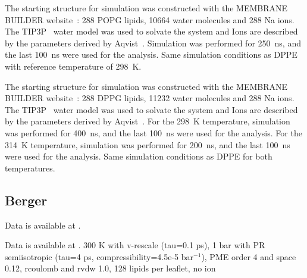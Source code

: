 \documentclass[journal=jpcbfk]{achemso}
\begin{document}
 The starting structure for simulation was constructed with the MEMBRANE BUILDER website~\cite{ghahremanpour13}: 288 POPG lipids, 10664 water molecules and 288 Na ions. The TIP3P~\cite{jorgensen83} water model was used to solvate the system and Ions are described by the parameters derived by Aqvist~\cite{aqvist90}.
Simulation was performed for 250~ns, and the last 100~ns were used for the analysis. Same simulation conditions as DPPE with reference temperature of 298~K.

 

 The starting structure for simulation was constructed with the MEMBRANE BUILDER website~\cite{ghahremanpour13}: 288 DPPG lipids, 11232 water molecules and 288 Na ions. The TIP3P~\cite{jorgensen83} water model was used to solvate the system and Ions are described by the parameters derived by Aqvist~\cite{aqvist90}. For the 298~K temperature, simulation was performed for 400~ns, and the last 100~ns were used for the analysis. For the 314~K temperature, simulation was performed for 200~ns, and the last 100~ns were used for the analysis. Same simulation conditions as DPPE for both temperatures.

 

 


\subsection{Berger}

 Data is available at \cite{bergerPOPEfiles,berger2POPEfiles}. 


 Data is available at \cite{POPCberger300K,POPC1POPE1berger}. 
300 K with v-rescale (tau=0.1 ps),
1 bar with PR semiisotropic (tau=4 ps, compressibility=4.5e-5 bar$^{-1}$),
PME order 4 and space 0.12,
rcoulomb and rvdw 1.0,
128 lipids per leaflet,
no ion 
\end{document}

